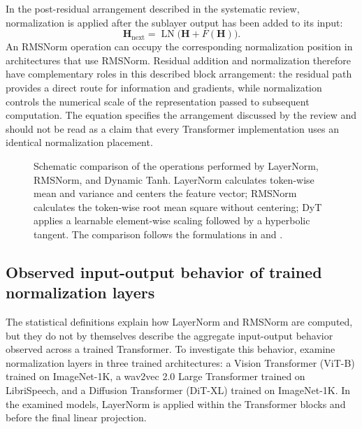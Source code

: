 In the post-residual arrangement described in the systematic review,
normalization is applied after the
sublayer output has been added to its input:
\begin{equation}
    \mathbf{H}_{\mathrm{next}}
    =
    \operatorname{LN}
    \bigl(\mathbf{H}+F(\mathbf{H})\bigr).
    \label{eq:norm-post-residual}
\end{equation}
An RMSNorm operation can occupy the corresponding normalization position
in architectures that use RMSNorm. Residual addition and normalization
therefore have complementary roles in this described block arrangement:
the residual path provides a direct route for information and gradients,
while normalization controls the numerical scale of the representation
passed to subsequent computation. The equation specifies the arrangement
discussed by the review and should not be read as a claim that every
Transformer implementation uses an identical normalization placement.

\begin{figure}[htbp]
    \centering
    
    \caption{Schematic comparison of the operations performed by LayerNorm,
    RMSNorm, and Dynamic Tanh. LayerNorm calculates token-wise mean and
    variance and centers the feature vector; RMSNorm calculates the
    token-wise root mean square without centering; DyT applies a learnable
    element-wise scaling followed by a hyperbolic tangent. The comparison
    follows the formulations in \textcite{zhu2025dyt} and
    \textcite{corradini2025slmreview}.}
    \label{fig:norm-method-comparison}
\end{figure}

\subsection{Observed input-output behavior of trained normalization layers}
\label{subsec:norm-observed-behavior}

The statistical definitions explain how LayerNorm and RMSNorm are computed,
but they do not by themselves describe the aggregate input-output behavior
observed across a trained Transformer. To investigate this behavior,
\textcite{zhu2025dyt} examine normalization layers in three trained
architectures: a Vision Transformer (ViT-B) trained on ImageNet-1K, a
wav2vec 2.0 Large Transformer trained on LibriSpeech, and a Diffusion
Transformer (DiT-XL) trained on ImageNet-1K. In the examined models,
LayerNorm is applied within the Transformer blocks and before the final
linear projection.

